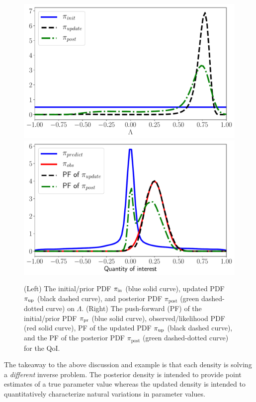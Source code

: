 %


\begin{figure}[htbp]
\centering
   \includegraphics[width=0.49\linewidth]{figures/cbayes_comp_sbayes_50000_paramdens_nonlinear-standalone.pdf}
   \includegraphics[width=0.49\linewidth]{figures/cbayes_comp_sbayes_50000_outdens_nonlinear-standalone.pdf}
 \caption{(Left) The initial/prior PDF $\operatorname*{\pi_{in}}$ (blue solid curve), updated PDF $\operatorname*{\pi_{up}}$ (black dashed curve), and posterior PDF $\pi_\text{post}$ (green dashed-dotted curve) on $\Lambda$.
 (Right) The push-forward (PF) of the initial/prior PDF $\operatorname*{\pi_{pr}}$ (blue solid curve), observed/likelihood PDF (red solid curve), PF of the updated PDF $\operatorname*{\pi_{up}}$ (black dashed curve), and the PF of the posterior PDF $\pi_\text{post}$ (green dashed-dotted curve) for the QoI.}
 \label{fig:bayes-comparison}
\end{figure}

The takeaway to the above discussion and example is that each density is solving a {\em different} inverse problem.
The posterior density is intended to provide point estimates of a true parameter value whereas the updated density is intended to quantitatively characterize natural variations in parameter values.

